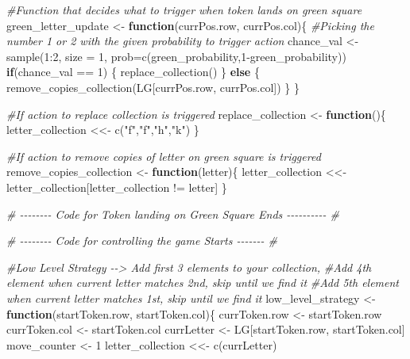 \documentclass[
]{article}
\newenvironment{Shaded}{\begin{snugshade}}{\end{snugshade}}
\newcommand{\AttributeTok}[1]{\textcolor[rgb]{0.77,0.63,0.00}{#1}}
\newcommand{\CommentTok}[1]{\textcolor[rgb]{0.56,0.35,0.01}{\textit{#1}}}
\newcommand{\ControlFlowTok}[1]{\textcolor[rgb]{0.13,0.29,0.53}{\textbf{#1}}}
\newcommand{\DecValTok}[1]{\textcolor[rgb]{0.00,0.00,0.81}{#1}}
\newcommand{\FunctionTok}[1]{\textcolor[rgb]{0.00,0.00,0.00}{#1}}
\newcommand{\NormalTok}[1]{#1}
\newcommand{\OtherTok}[1]{\textcolor[rgb]{0.56,0.35,0.01}{#1}}
\newcommand{\SpecialCharTok}[1]{\textcolor[rgb]{0.00,0.00,0.00}{#1}}
\newcommand{\StringTok}[1]{\textcolor[rgb]{0.31,0.60,0.02}{#1}}
\begin{document}
\begin{Shaded}
\begin{Highlighting}[]
\CommentTok{\#Function that decides what to trigger when token lands on green square}
\NormalTok{green\_letter\_update }\OtherTok{\textless{}{-}} \ControlFlowTok{function}\NormalTok{(currPos.row, currPos.col)\{}
  \CommentTok{\#Picking the number 1 or 2 with the given probability to trigger action }
\NormalTok{  chance\_val }\OtherTok{\textless{}{-}} \FunctionTok{sample}\NormalTok{(}\DecValTok{1}\SpecialCharTok{:}\DecValTok{2}\NormalTok{, }\AttributeTok{size =} \DecValTok{1}\NormalTok{, }\AttributeTok{prob=}\FunctionTok{c}\NormalTok{(green\_probability,}\DecValTok{1}\SpecialCharTok{{-}}\NormalTok{green\_probability))}
  \ControlFlowTok{if}\NormalTok{(chance\_val }\SpecialCharTok{==} \DecValTok{1}\NormalTok{) \{}
    \FunctionTok{replace\_collection}\NormalTok{()}
\NormalTok{  \} }\ControlFlowTok{else}\NormalTok{ \{}
    \FunctionTok{remove\_copies\_collection}\NormalTok{(LG[currPos.row, currPos.col])}
\NormalTok{  \}}
\NormalTok{\}}

\CommentTok{\#If action to replace collection is triggered}
\NormalTok{replace\_collection }\OtherTok{\textless{}{-}} \ControlFlowTok{function}\NormalTok{()\{}
\NormalTok{  letter\_collection }\OtherTok{\textless{}\textless{}{-}} \FunctionTok{c}\NormalTok{(}\StringTok{"f"}\NormalTok{,}\StringTok{"f"}\NormalTok{,}\StringTok{"h"}\NormalTok{,}\StringTok{"k"}\NormalTok{)}
\NormalTok{\}}

\CommentTok{\#If action to remove copies of letter on green square is triggered}
\NormalTok{remove\_copies\_collection }\OtherTok{\textless{}{-}} \ControlFlowTok{function}\NormalTok{(letter)\{}
\NormalTok{  letter\_collection }\OtherTok{\textless{}\textless{}{-}}\NormalTok{ letter\_collection[letter\_collection }\SpecialCharTok{!=}\NormalTok{ letter]}
\NormalTok{\}}

\CommentTok{\# {-}{-}{-}{-}{-}{-}{-}{-} Code for Token landing on Green Square Ends {-}{-}{-}{-}{-}{-}{-}{-}{-}{-} \#}



\CommentTok{\# {-}{-}{-}{-}{-}{-}{-}{-} Code for controlling the game Starts {-}{-}{-}{-}{-}{-}{-} \#}

\CommentTok{\#Low Level Strategy {-}{-}\textgreater{} Add first 3 elements to your collection,}
\CommentTok{\#Add 4th element when current letter matches 2nd, skip until we find it}
\CommentTok{\#Add 5th element when current letter matches 1st, skip until we find it}
\NormalTok{low\_level\_strategy }\OtherTok{\textless{}{-}} \ControlFlowTok{function}\NormalTok{(startToken.row, startToken.col)\{}
\NormalTok{  currToken.row }\OtherTok{\textless{}{-}}\NormalTok{ startToken.row}
\NormalTok{  currToken.col }\OtherTok{\textless{}{-}}\NormalTok{ startToken.col}
\NormalTok{  currLetter }\OtherTok{\textless{}{-}}\NormalTok{ LG[startToken.row, startToken.col]}
\NormalTok{  move\_counter }\OtherTok{\textless{}{-}} \DecValTok{1}
\NormalTok{  letter\_collection }\OtherTok{\textless{}\textless{}{-}} \FunctionTok{c}\NormalTok{(currLetter)}
  

\end{Highlighting}
\end{Shaded}
\end{document}
